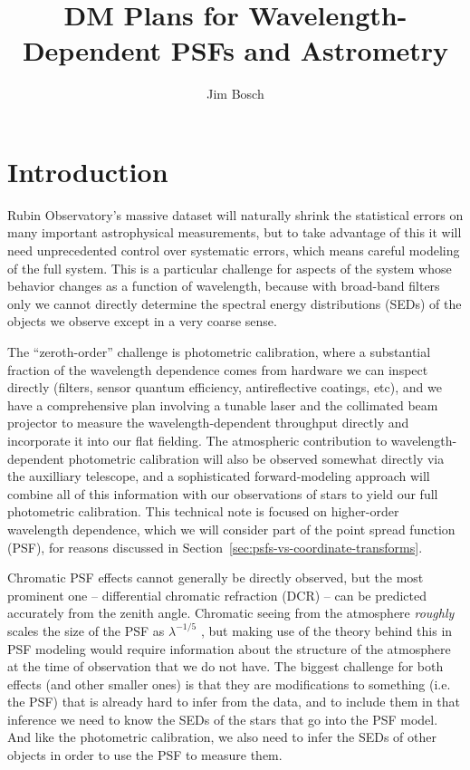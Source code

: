 \documentclass[DM,authoryear,toc]{lsstdoc}
\title{DM Plans for Wavelength-Dependent PSFs and Astrometry}
\author{%
Jim Bosch
}
\date{\vcsDate}
\begin{document}
\maketitle

\section{Introduction}

Rubin Observatory's massive dataset will naturally shrink the statistical errors on many important astrophysical measurements, but to take advantage of this it will need unprecedented control over systematic errors, which means careful modeling of the full system.
This is a particular challenge for aspects of the system whose behavior changes as a function of wavelength, because with broad-band filters only we cannot directly determine the spectral energy distributions (SEDs) of the objects we observe except in a very coarse sense.

The ``zeroth-order'' challenge is photometric calibration, where a substantial fraction of the wavelength dependence comes from hardware we can inspect directly (filters, sensor quantum efficiency, antireflective coatings, etc), and we have a comprehensive plan involving a tunable laser and the collimated beam projector to measure the wavelength-dependent throughput directly and incorporate it into our flat fielding.
The atmospheric contribution to wavelength-dependent photometric calibration will also be observed somewhat directly via the auxilliary telescope, and a sophisticated forward-modeling approach will combine all of this information with our observations of stars to yield our full photometric calibration.
This technical note is focused on higher-order wavelength dependence, which we will consider part of the point spread function (PSF), for reasons discussed in Section~\ref{sec:psfs-vs-coordinate-transforms}.

Chromatic PSF effects cannot generally be directly observed, but the most prominent one -- differential chromatic refraction (DCR) -- can be predicted accurately from the zenith angle.
Chromatic seeing from the atmosphere \emph{roughly} scales the size of the PSF as $\lambda^{-1/5}$ \citep{1966JOSA...56.1372F,2015ApJ...807..182M}, but making use of the theory behind this in PSF modeling would require information about the structure of the atmosphere at the time of observation that we do not have.
The biggest challenge for both effects (and other smaller ones) is that they are modifications to something (i.e. the PSF) that is already hard to infer from the data, and to include them in that inference we need to know the SEDs of the stars that go into the PSF model.
And like the photometric calibration, we also need to infer the SEDs of other objects in order to use the PSF to measure them.
\end{document}

